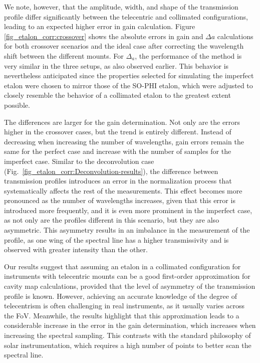 We note, however, that the amplitude, width, and shape of the transmission profile differ significantly between the telecentric and collimated configurations, leading to an expected higher error in gain calculation. Figure \ref{fig_etalon_corr:crossover} shows the absolute errors in gain and $\Delta a$ calculations for both crossover scenarios and the ideal case after correcting the wavelength shift between the different mounts. For $\Delta_a$, the performance of the method is very similar in the three setups, as also observed earlier. This behavior is nevertheless anticipated since the properties selected for simulating the imperfect etalon were chosen to mirror those of the SO-PHI etalon, which were adjusted to closely resemble the behavior of a collimated etalon to the greatest extent possible.

The differences are larger for the gain determination. Not only are the errors higher in the crossover cases, but the trend is entirely different. Instead of decreasing when increasing the number of wavelengths, gain errors remain the same for the perfect case and increase with the number of samples for the imperfect case. Similar to the deconvolution case (Fig.~\ref{fig_etalon_corr:Deconvolution-results}), the difference between transmission profiles introduces an error in the normalization process that systematically affects the rest of the measurements. This effect becomes more pronounced as the number of wavelengths increases, given that this error is introduced more frequently, and it is even more prominent in the imperfect case, as not only are the profiles different in this scenario, but they are also asymmetric. This asymmetry results in an imbalance in the measurement of the profile, as one wing of the spectral line has a higher transmissivity and is observed with greater intensity than the other.

Our results suggest that assuming an etalon in a collimated configuration for instruments with telecentric mounts can be a good first-order approximation for cavity map calculations, provided that the level of asymmetry of the transmission profile is known. However, achieving an accurate knowledge of the degree of telecentrism is often challenging in real instruments, as it usually varies across the FoV. Meanwhile, the results highlight that this approximation leads to a considerable increase in the error in the gain determination, which increases when increasing the spectral sampling. This contrasts with the standard philosophy of solar instrumentation, which requires a high number of points to better scan the spectral line.